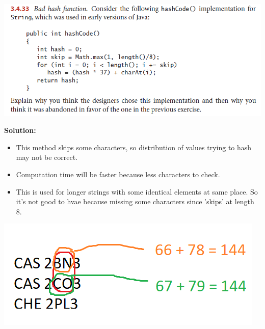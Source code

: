 \documentclass[11pt,fleqn]{article}
\begin{document}
\begin{center}
	\includegraphics[scale=.85]{3.4.33.png}
\end{center}
	
\textbf{Solution:}\\
\begin{itemize}
	\item This method skips some characters, so distribution of values trying to hash may not be correct.
	\item Computation time will be faster because less characters to check.
	\item This is used for longer strings with some identical elements at same place. So it's not good to hvae because missing some characters since 'skips' at length 8.
\end{itemize}

\begin{center}
	\includegraphics[scale=.85]{3.4.33-SOLN.png}
\end{center}
	
\end{document}
